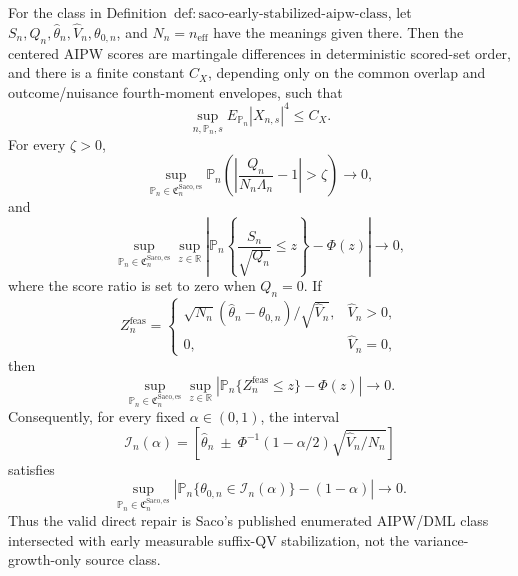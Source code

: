 For the class in Definition~\(\mathrm{def:saco\text{-}early\text{-}stabilized\text{-}aipw\text{-}class}\), let \(S_n,Q_n,\widehat\theta_n,\widehat V_n,\theta_{0,n}\), and \(N_n=n_{\mathrm{eff}}\) have the meanings given there.  Then the centered AIPW scores are martingale differences in deterministic scored-set order, and there is a finite constant \(C_X\), depending only on the common overlap and outcome/nuisance fourth-moment envelopes, such that
\[
\sup_{n,\mathbb P_n,s}E_{\mathbb P_n}|X_{n,s}|^4\le C_X.
\]
For every \(\zeta>0\),
\[
\sup_{\mathbb P_n\in\mathfrak C_n^{\mathrm{Saco,es}}}
\mathbb P_n\left(\left|\frac{Q_n}{N_n\Lambda_n}-1\right|>\zeta\right)\longrightarrow0,
\]
and
\[
\sup_{\mathbb P_n\in\mathfrak C_n^{\mathrm{Saco,es}}}\sup_{z\in\mathbb R}
\left|\mathbb P_n\left\{\frac{S_n}{\sqrt{Q_n}}\le z\right\}-\Phi(z)\right|\longrightarrow0,
\]
where the score ratio is set to zero when \(Q_n=0\).  If
\[
Z_n^{\mathrm{feas}}=
\begin{cases}
\sqrt{N_n}(\widehat\theta_n-\theta_{0,n})/\sqrt{\widehat V_n},&\widehat V_n>0,\\
0,&\widehat V_n=0,
\end{cases}
\]
then
\[
\sup_{\mathbb P_n\in\mathfrak C_n^{\mathrm{Saco,es}}}\sup_{z\in\mathbb R}
\left|\mathbb P_n\{Z_n^{\mathrm{feas}}\le z\}-\Phi(z)\right|\longrightarrow0.
\]
Consequently, for every fixed \(\alpha\in(0,1)\), the interval
\[
\mathcal I_n(\alpha)=\left[\widehat\theta_n\ \pm\ \Phi^{-1}(1-\alpha/2)\sqrt{\widehat V_n/N_n}\right]
\]
satisfies
\[
\sup_{\mathbb P_n\in\mathfrak C_n^{\mathrm{Saco,es}}}
\left|\mathbb P_n\{\theta_{0,n}\in\mathcal I_n(\alpha)\}-(1-\alpha)\right|\longrightarrow0.
\]
Thus the valid direct repair is Saco's published enumerated AIPW/DML class intersected with early measurable suffix-QV stabilization, not the variance-growth-only source class.